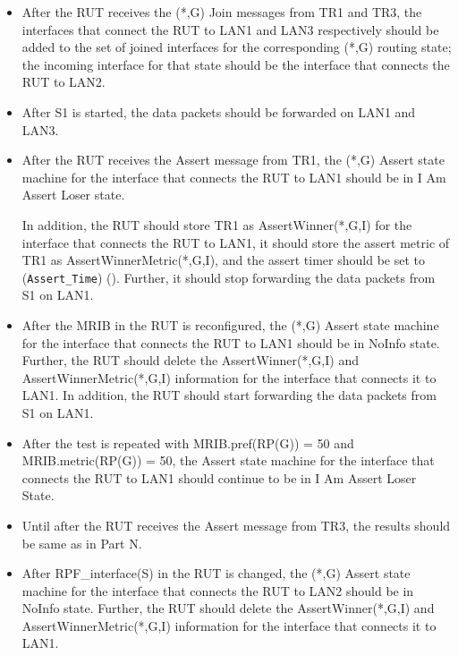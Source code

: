 \documentclass[11pt]{report}
\begin{document}

\begin{itemize}

  \item After the RUT receives the (*,G) Join messages from TR1 and TR3, the
  interfaces that connect the RUT to LAN1 and LAN3 respectively should be
  added to the set of joined interfaces for the corresponding (*,G) routing
  state; the incoming interface for that state should be the interface that
  connects the RUT to LAN2.

  \item After S1 is started, the data packets should be forwarded on LAN1 and
  LAN3.

  \item After the RUT receives the Assert message from TR1, the (*,G)
  Assert state machine for the interface that connects the RUT to LAN1 should
  be in I Am Assert Loser state.

  In addition, the RUT should store TR1 as AssertWinner(*,G,I) for the
  interface that connects the RUT to LAN1, it should store the assert metric
  of TR1 as AssertWinnerMetric(*,G,I), and the assert timer should be set to
  (\verb=Assert_Time=) ({\PimsmAssertTime}).
  Further, it should stop forwarding the data packets from S1 on LAN1.

  \item After the MRIB in the RUT is reconfigured, the (*,G)
  Assert state machine for the interface that connects the RUT to LAN1 should
  be in NoInfo state.
  Further, the RUT should delete the AssertWinner(*,G,I) and
  AssertWinnerMetric(*,G,I) information for the interface that connects it to
  LAN1.
  In addition, the RUT should start forwarding the data packets from S1 on
  LAN1.

  \item After the test is repeated with MRIB.pref(RP(G)) = 50
  and MRIB.metric(RP(G)) = 50, the Assert state machine for the interface that
  connects the RUT to LAN1 should continue to be in I Am Assert Loser State.

\end{itemize}


\begin{itemize}

  \item Until after the RUT receives the Assert message from TR3, the
  results should be same as in Part N.

  \item After RPF\_interface(S) in the RUT is changed, the (*,G)
  Assert state machine for the interface that connects the RUT to LAN2 should
  be in NoInfo state.
  Further, the RUT should delete the AssertWinner(*,G,I) and
  AssertWinnerMetric(*,G,I) information for the interface that connects it to
  LAN1.

\end{itemize}
\end{document}
